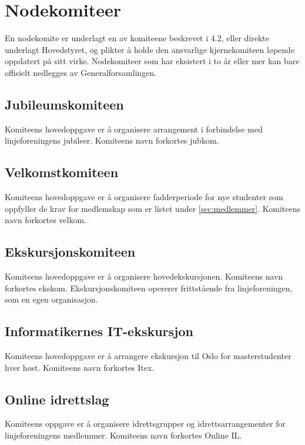 \section{Nodekomiteer}
\vspace{23pt}
En nodekomite er underlagt en av komiteene beskrevet i 4.2, eller direkte underlagt Hovedstyret, og plikter å holde den ansvarlige kjernekomiteen løpende oppdatert på sitt virke. Nodekomiteer som har eksistert i to år eller mer kan bare offisielt nedlegges av Generalforsamlingen.




\subsection{Jubileumskomiteen}{
Komiteens hovedoppgave er å organisere arrangement i forbindelse med linjeforeningens jubileer. Komiteens navn forkortes jubkom.

}

\subsection{Velkomstkomiteen}{
Komiteens hovedoppgave er å organisere fadderperiode for nye studenter som oppfyller de krav for medlemskap som er listet under \ref{sec:medlemmer}. Komiteens navn forkortes velkom.
}

\subsection{Ekskursjonskomiteen}{
Komiteens hovedoppgave er å organisere hovedekskursjonen. Komiteens navn forkortes ekskom. Ekskursjonskomiteen opererer frittstående fra linjeforeningen, som en egen organisasjon.
}

\subsection{Informatikernes IT-ekskursjon}{
Komiteens hovedoppgave er å arrangere ekskursjon til Oslo for masterstudenter hver høst. Komiteens navn forkortes Itex.
}

\subsection{Online idrettslag}
Komiteens oppgave er å organisere idrettsgrupper og idrettsarrangementer for linjeforeningens medlemmer. Komiteens navn forkortes Online IL.


